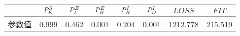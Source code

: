\begin{tabular}{cccccccc}
\hline
&$\P{S}{E}$&$\P{E}{I}$&$\P{E}{R}$&$\P{I}{R}$&$\P{I}{D}$&$LOSS$&$FIT$\\
\hline
参数值&0.999&0.462&0.001&0.204&0.001&1212.778&215.519\\
\hline
\end{tabular}